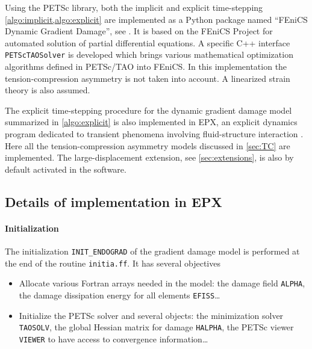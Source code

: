 Using the PETSc library, both the implicit and explicit time-stepping \cref{algo:implicit,algo:explicit} are implemented as a Python package named ``FEniCS Dynamic Gradient Damage'', see \cite{LiMaurini:2015}. It is based on the FEniCS Project \cite{LoggMardalWells:2012} for automated solution of partial differential equations. A specific C++ interface \texttt{PETScTAOSolver} is developed which brings various mathematical optimization algorithms defined in PETSc/TAO into FEniCS. In this implementation the tension-compression asymmetry is not taken into account. A linearized strain theory is also assumed.

The explicit time-stepping procedure for the dynamic gradient damage model summarized in \cref{algo:explicit} is also implemented in EPX, an explicit dynamics program dedicated to transient phenomena involving fluid-structure interaction \cite{EPX:2015}. Here all the tension-compression asymmetry models discussed in \cref{sec:TC} are implemented. The large-displacement extension, see \cref{sec:extensions}, is also by default activated in the software.

\subsection{Details of implementation in EPX} \label{sec:epx}
\paragraph{Initialization}
The initialization \texttt{INIT\_ENDOGRAD} of the gradient damage model is performed at the end of the routine \texttt{initia.ff}. It has several objectives
\begin{itemize}
\item Allocate various Fortran arrays needed in the model: the damage field \texttt{ALPHA}, the damage dissipation energy for all elements \texttt{EFISS}\ldots

\item Initialize the PETSc solver and several objects: the minimization solver \texttt{TAOSOLV}, the global Hessian matrix for damage \texttt{HALPHA}, the PETSc viewer \texttt{VIEWER} to have access to convergence information\ldots
\end{itemize}

